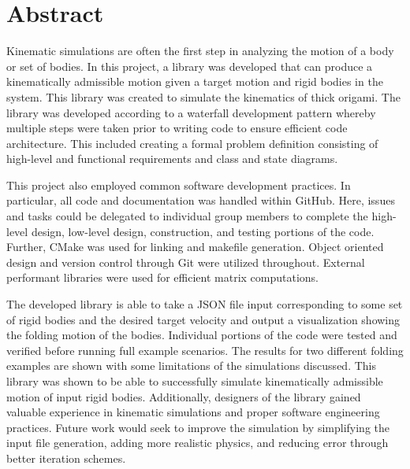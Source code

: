 \newpage
\section*{Abstract}
Kinematic simulations are often the first step in analyzing the motion of a body or set of bodies. In this project, a library was developed that can produce a kinematically admissible motion given a target motion and rigid bodies in the system. This library was created to simulate the kinematics of thick origami. The library was developed according to a waterfall development pattern whereby multiple steps were taken prior to writing code to ensure efficient code architecture. This included creating a formal problem definition consisting of high-level and functional requirements and class and state diagrams.

This project also employed common software development practices. In particular, all code and documentation was handled within GitHub. Here, issues and tasks could be delegated to individual group members to complete the high-level design, low-level design, construction, and testing portions of the code. Further, CMake was used for linking and makefile generation. Object oriented design and version control through Git were utilized throughout. External performant libraries were used for efficient matrix computations. 

The developed library is able to take a JSON file input corresponding to some set of rigid bodies and the desired target velocity and output a visualization showing the folding motion of the bodies. Individual portions of the code were tested and verified before running full example scenarios. The results for two different folding examples are shown with some limitations of the simulations discussed. This library was shown to be able to successfully simulate kinematically admissible motion of input rigid bodies. Additionally, designers of the library gained valuable experience in kinematic simulations and proper software engineering practices. Future work would seek to improve the simulation by simplifying the input file generation, adding more realistic physics, and reducing error through better iteration schemes. 